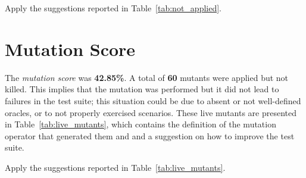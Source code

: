 \action Apply the suggestions reported in Table~\ref{tab:not_applied}.

 


\section{Mutation Score}

 The \emph{mutation score} was \textbf{42.85\%}. A total of \textbf{60} mutants were applied but not killed. This implies that the mutation was performed but it did not lead to failures in the test suite; this situation could be due to absent or not well-defined oracles, or to not properly exercised scenarios.
 These live mutants are presented in Table~\ref{tab:live_mutants}, which contains the definition of the mutation operator that generated them and and a suggestion on how to improve the test suite.

\action Apply the suggestions reported in Table~\ref{tab:live_mutants}.


